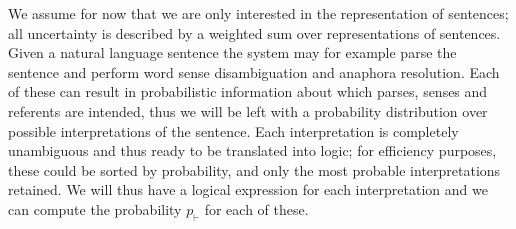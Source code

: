 We assume for now that we are only interested in the representation of sentences; all uncertainty is described by a weighted sum over representations of sentences. Given a natural language sentence the system may for example parse the sentence and perform word sense disambiguation and anaphora resolution. Each of these can result in probabilistic information about which parses, senses and referents are intended, thus we will be left with a probability distribution over possible interpretations of the sentence.  Each interpretation is completely unambiguous and thus ready to be translated into logic; for efficiency purposes, these could be sorted by probability, and only the most probable interpretations retained. We will thus have a logical expression for each interpretation and we can compute the probability $p_\vdash$ for each of these.

